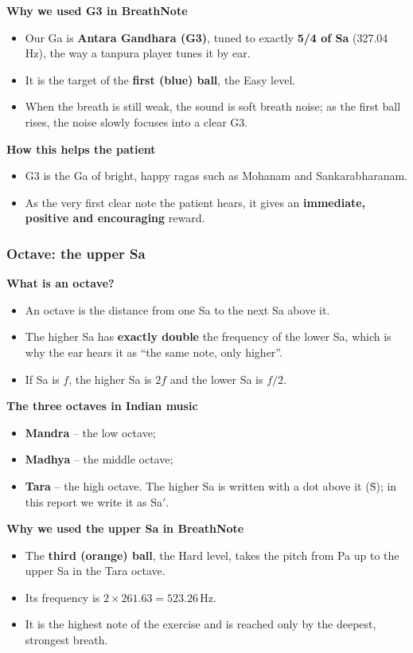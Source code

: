 \documentclass[12pt,a4paper]{article}
\newcommand{\Sah}{Sa\ensuremath{'}}     %
\begin{document}
\textbf{Why we used G3 in BreathNote}
\begin{itemize}
  \item Our Ga is \textbf{Antara Gandhara (G3)}, tuned to exactly \textbf{5/4 of Sa} (327.04\,Hz), the way a tanpura player tunes it by ear.
  \item It is the target of the \textbf{first (blue) ball}, the Easy level.
  \item When the breath is still weak, the sound is soft breath noise; as the first ball rises, the noise slowly focuses into a clear G3.
\end{itemize}

\textbf{How this helps the patient}
\begin{itemize}
  \item G3 is the Ga of bright, happy ragas such as Mohanam and Sankarabharanam.
  \item As the very first clear note the patient hears, it gives an \textbf{immediate, positive and encouraging} reward.
\end{itemize}

\subsubsection{Octave: the upper Sa}
\textbf{What is an octave?}
\begin{itemize}
  \item An octave is the distance from one Sa to the next Sa above it.
  \item The higher Sa has \textbf{exactly double} the frequency of the lower Sa, which is why the ear hears it as ``the same note, only higher''.
  \item If Sa is $f$, the higher Sa is $2f$ and the lower Sa is $f/2$.
\end{itemize}

\textbf{The three octaves in Indian music}
\begin{itemize}
  \item \textbf{Mandra} -- the low octave;
  \item \textbf{Madhya} -- the middle octave;
  \item \textbf{Tara} -- the high octave. The higher Sa is written with a dot above it (\.{S}); in this report we write it as \Sah.
\end{itemize}

\textbf{Why we used the upper Sa in BreathNote}
\begin{itemize}
  \item The \textbf{third (orange) ball}, the Hard level, takes the pitch from Pa up to the upper Sa in the Tara octave.
  \item Its frequency is $2 \times 261.63 = 523.26$\,Hz.
  \item It is the highest note of the exercise and is reached only by the deepest, strongest breath.
\end{itemize}
\end{document}
